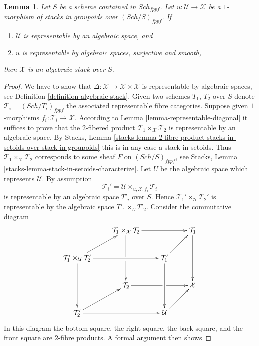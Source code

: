 \documentclass{stacks-project}
\theoremstyle{plain}
\newtheorem{lemma}[subsection]{Lemma}
\theoremstyle{definition}
\theoremstyle{remark}
\numberwithin{equation}{subsection}
\def\Sch{\mathit{Sch}}
\begin{document}
\begin{lemma}
\label{lemma-smooth-surjective-morphism-implies-algebraic}
Let $S$ be a scheme contained in $\Sch_{fppf}$.
Let $u : \mathcal{U} \to \mathcal{X}$ be a $1$-morphism of
stacks in groupoids over $(\Sch/S)_{fppf}$. If
\begin{enumerate}
\item $\mathcal{U}$ is representable by an algebraic space, and
\item $u$ is representable by algebraic spaces, surjective and smooth,
\end{enumerate}
then $\mathcal X$ is an algebraic stack over $S$.
\end{lemma}

\begin{proof}
We have to show that $\Delta : \mathcal{X} \to \mathcal{X} \times \mathcal{X}$
is representable by algebraic spaces, see
Definition \ref{definition-algebraic-stack}.
Given two schemes $T_1$, $T_2$ over $S$ denote
$\mathcal{T}_i = (\Sch/T_i)_{fppf}$ the associated representable
fibre categories. Suppose given $1$-morphisms
$f_i : \mathcal{T}_i \to \mathcal{X}$.
According to
Lemma \ref{lemma-representable-diagonal}
it suffices to prove that the $2$-fibered
product $\mathcal{T}_1 \times_\mathcal{X} \mathcal{T}_2$
is representable by an algebraic space. By
Stacks, Lemma
\ref{stacks-lemma-2-fibre-product-stacks-in-setoids-over-stack-in-groupoids}
this is in any case a stack in setoids. Thus
$\mathcal{T}_1 \times_\mathcal{X} \mathcal{T}_2$ corresponds
to some sheaf $F$ on $(\Sch/S)_{fppf}$, see
Stacks, Lemma \ref{stacks-lemma-stack-in-setoids-characterize}.
Let $U$ be the algebraic space which represents $\mathcal{U}$.
By assumption
$$
\mathcal{T}_i' = \mathcal{U} \times_{u, \mathcal{X}, f_i} \mathcal{T}_i
$$
is representable by an algebraic space $T'_i$ over $S$. Hence
$\mathcal{T}_1' \times_\mathcal{U} \mathcal{T}_2'$ is representable
by the algebraic space $T'_1 \times_U T'_2$.
Consider the commutative diagram
$$
\xymatrix{
&
\mathcal{T}_1 \times_{\mathcal X} \mathcal{T}_2 \ar[rr]\ar'[d][dd] & &
\mathcal{T}_1 \ar[dd] \\
\mathcal{T}_1' \times_\mathcal{U} \mathcal{T}_2' \ar[ur]\ar[rr]\ar[dd] & &
\mathcal{T}_1' \ar[ur]\ar[dd] \\
&
\mathcal{T}_2 \ar'[r][rr] & &
\mathcal X \\
\mathcal{T}_2' \ar[rr]\ar[ur] & &
\mathcal{U} \ar[ur] }
$$
In this diagram the bottom square, the right square, the back square, and
the front square are $2$-fibre products. A formal argument then shows

\end{proof}
\end{document}
